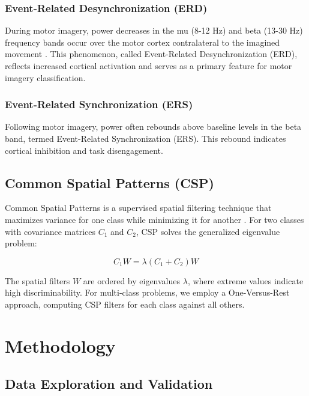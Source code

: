 \documentclass[11pt]{article}
\begin{document}
\subsubsection{Event-Related Desynchronization (ERD)}

During motor imagery, power decreases in the mu (8-12 Hz) and beta (13-30 Hz) frequency bands occur over the motor cortex contralateral to the imagined movement \citep{pfurtscheller1999motor}. This phenomenon, called Event-Related Desynchronization (ERD), reflects increased cortical activation and serves as a primary feature for motor imagery classification.

\subsubsection{Event-Related Synchronization (ERS)}

Following motor imagery, power often rebounds above baseline levels in the beta band, termed Event-Related Synchronization (ERS). This rebound indicates cortical inhibition and task disengagement.

\subsection{Common Spatial Patterns (CSP)}

Common Spatial Patterns is a supervised spatial filtering technique that maximizes variance for one class while minimizing it for another \citep{ramoser2000optimal}. For two classes with covariance matrices $C_1$ and $C_2$, CSP solves the generalized eigenvalue problem:

\begin{equation}
C_1 W = \lambda (C_1 + C_2) W
\end{equation}

The spatial filters $W$ are ordered by eigenvalues $\lambda$, where extreme values indicate high discriminability. For multi-class problems, we employ a One-Versus-Rest approach, computing CSP filters for each class against all others.

\section{Methodology}

\subsection{Data Exploration and Validation}
\end{document}
